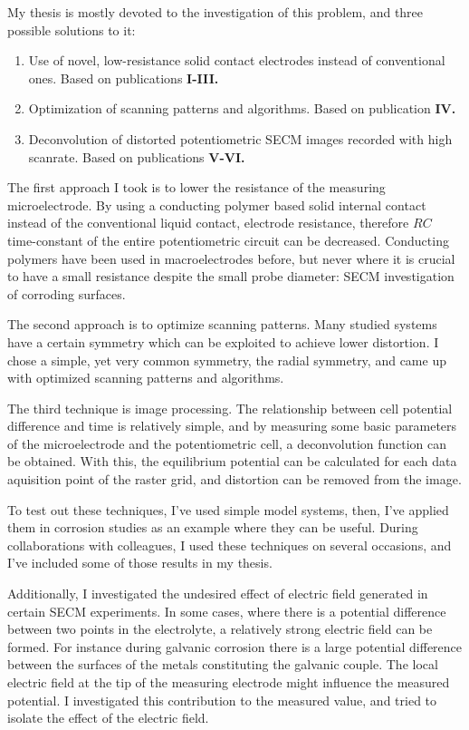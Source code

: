 My thesis is mostly devoted to the investigation of this problem, and three possible solutions to it:

\begin{enumerate}
\item Use of novel, low-resistance solid contact electrodes instead of conventional ones.
Based on publications \textbf{\color{blue}I-III.}
\item Optimization of scanning patterns and algorithms.
Based on publication \textbf{\color{blue}IV.}
\item Deconvolution of distorted potentiometric SECM images recorded with high scanrate.
Based on publications \textbf{\color{blue}V-VI.}
\end{enumerate}

The first approach I took is to lower the resistance of the measuring microelectrode.
By using a conducting polymer based solid internal contact instead of the conventional liquid contact, electrode resistance, therefore $RC$ time-constant of the entire potentiometric circuit can be decreased.
Conducting polymers have been used in macroelectrodes before, but never where it is crucial to have a small resistance despite the small probe diameter: SECM investigation of corroding surfaces.

The second approach is to optimize scanning patterns.
Many studied systems have a certain symmetry which can be exploited to achieve lower distortion.
I chose a simple, yet very common symmetry, the radial symmetry, and came up with optimized scanning patterns and algorithms.

The third technique is image processing.
The relationship between cell potential difference and time is relatively simple, and by measuring some basic parameters of the microelectrode and the potentiometric cell, a deconvolution function can be obtained.
With this, the equilibrium potential can be calculated for each data aquisition point of the raster grid, and distortion can be removed from the image.

To test out these techniques, I've used simple model systems, then, I've applied them in corrosion studies as an example where they can be useful.
During collaborations with colleagues, I used these techniques on several occasions, and I've included some of those results in my thesis.

Additionally, I investigated the undesired effect of electric field generated in certain SECM experiments. In some cases, where there is a potential difference between two points in the electrolyte, a relatively strong electric field can be formed. For instance during galvanic corrosion there is a large potential difference between the surfaces of the metals constituting the galvanic couple. The local electric field at the tip of the measuring electrode might influence the measured potential. I investigated this contribution to the measured value, and tried to isolate the effect of the electric field.
